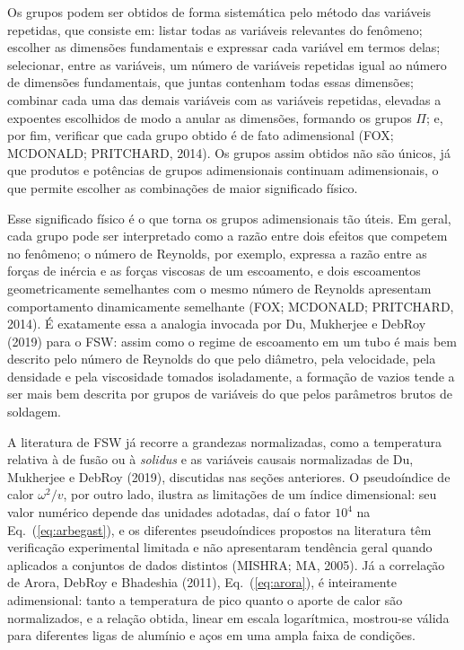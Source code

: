 \documentclass[12pt,openany]{report}
\begin{document}
Os grupos podem ser obtidos de forma sistemática pelo método das variáveis repetidas, que consiste em: listar todas as variáveis relevantes do fenômeno; escolher as dimensões fundamentais e expressar cada variável em termos delas; selecionar, entre as variáveis, um número de variáveis repetidas igual ao número de dimensões fundamentais, que juntas contenham todas essas dimensões; combinar cada uma das demais variáveis com as variáveis repetidas, elevadas a expoentes escolhidos de modo a anular as dimensões, formando os grupos $\Pi$; e, por fim, verificar que cada grupo obtido é de fato adimensional (FOX; MCDONALD; PRITCHARD, 2014). Os grupos assim obtidos não são únicos, já que produtos e potências de grupos adimensionais continuam adimensionais, o que permite escolher as combinações de maior significado físico.

Esse significado físico é o que torna os grupos adimensionais tão úteis. Em geral, cada grupo pode ser interpretado como a razão entre dois efeitos que competem no fenômeno; o número de Reynolds, por exemplo, expressa a razão entre as forças de inércia e as forças viscosas de um escoamento, e dois escoamentos geometricamente semelhantes com o mesmo número de Reynolds apresentam comportamento dinamicamente semelhante (FOX; MCDONALD; PRITCHARD, 2014). É exatamente essa a analogia invocada por Du, Mukherjee e DebRoy (2019) para o FSW: assim como o regime de escoamento em um tubo é mais bem descrito pelo número de Reynolds do que pelo diâmetro, pela velocidade, pela densidade e pela viscosidade tomados isoladamente, a formação de vazios tende a ser mais bem descrita por grupos de variáveis do que pelos parâmetros brutos de soldagem.

A literatura de FSW já recorre a grandezas normalizadas, como a temperatura relativa à de fusão ou à \textit{solidus} e as variáveis causais normalizadas de Du, Mukherjee e DebRoy (2019), discutidas nas seções anteriores. O pseudoíndice de calor $\omega^{2}/v$, por outro lado, ilustra as limitações de um índice dimensional: seu valor numérico depende das unidades adotadas, daí o fator $10^{4}$ na Eq.~(\ref{eq:arbegast}), e os diferentes pseudoíndices propostos na literatura têm verificação experimental limitada e não apresentaram tendência geral quando aplicados a conjuntos de dados distintos (MISHRA; MA, 2005). Já a correlação de Arora, DebRoy e Bhadeshia (2011), Eq.~(\ref{eq:arora}), é inteiramente adimensional: tanto a temperatura de pico quanto o aporte de calor são normalizados, e a relação obtida, linear em escala logarítmica, mostrou-se válida para diferentes ligas de alumínio e aços em uma ampla faixa de condições.
\end{document}
